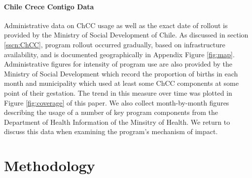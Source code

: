 \documentclass[12pt]{article}
\begin{document}
\begin{spacing}{1.4}
\paragraph{Chile Crece Contigo Data} Administrative data on ChCC
usage as well as the exact date of rollout is provided by the
Ministry of Social Development of Chile.  As discussed in section
\ref{sscn:ChCC}, program rollout occurred gradually, based on
infrastructure availability, and is documented geographically
in Appendix Figure \ref{fig:map}.  Administrative figures for
intensity of program use are also provided by the Ministry of
Social Development which record the proportion of births in each
month and municipality which used at least some ChCC components at
some point of their gestation.  The trend in this measure over
time was plotted in Figure \ref{fig:coverage} of this paper.
We also collect month-by-month figures describing the usage of a
number of key program components from the Department of Health
Information of the Minsitry of Health.  We return to discuss
this data when examining the program's mechanism of impact.

\section{Methodology}
\label{scn:methods}

\end{spacing}
\end{document}
